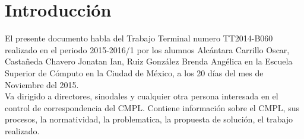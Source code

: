 \section{Introducción}

El presente documento habla del Trabajo Terminal numero TT2014-B060 realizado en el periodo 2015-2016/1 por los alumnos Alcántara Carrillo Oscar, Castañeda Chavero Jonatan Ian, Ruiz González Brenda Angélica en la Escuela Superior de Cómputo en la Ciudad de México, a los 20 días del mes de Noviembre del 2015.\\

Va dirigido a directores, sinodales y cualquier otra persona interesada en el control de correspondencia del CMPL. Contiene información sobre el CMPL, sus procesos, la normatividad, la problematica, la propuesta de solución, el trabajo realizado. \\
